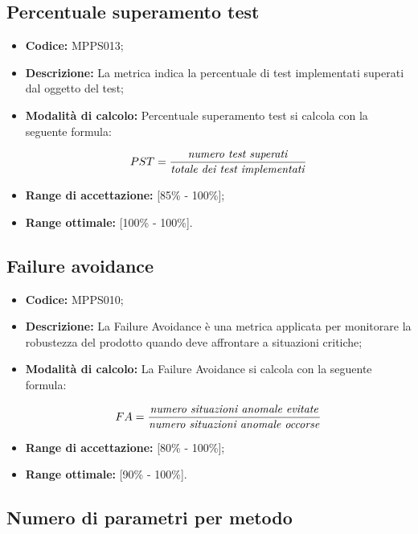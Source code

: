 \documentclass[openany,12pt,a4paper]{report}
\begin{document}
\subsection{Percentuale superamento test}

\begin{itemize}
    \item \textbf{Codice:} MPPS013;
    \item \textbf{Descrizione:} La metrica indica la percentuale di test implementati superati dal oggetto del test;
    \item \textbf{Modalità di calcolo:} Percentuale superamento test si calcola con la seguente formula:
    
    \[ PST = \frac{\textrm{\textit{numero test superati}}}{\textrm{\textit{totale dei test implementati}}} \]
    
    \item \textbf{Range di accettazione:} [85\% - 100\%];
    \item \textbf{Range ottimale:} [100\% - 100\%].
\end{itemize}

\subsection{Failure avoidance}

\begin{itemize}
    \item \textbf{Codice:} MPPS010;
    \item \textbf{Descrizione:} La Failure Avoidance è una metrica applicata per monitorare la robustezza del prodotto quando deve affrontare a situazioni critiche;
    \item \textbf{Modalità di calcolo:} La Failure Avoidance si calcola con la seguente formula:
    
    \[ FA = \frac{\textrm{\textit{numero situazioni anomale evitate}}}{\textrm{\textit{numero situazioni anomale occorse}}} \]
    
    \item \textbf{Range di accettazione:} [80\% - 100\%];
    \item \textbf{Range ottimale:} [90\% - 100\%].
\end{itemize}

\subsection{Numero di parametri per metodo}
\end{document}
